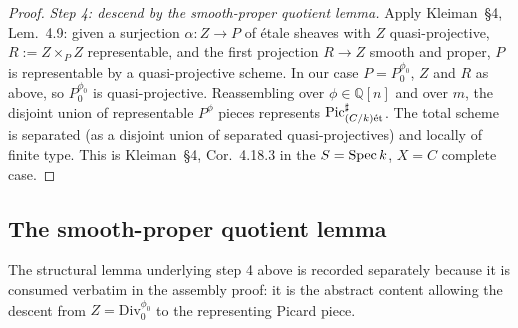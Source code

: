 \begin{proof}
  \emph{Step 4: descend by the smooth-proper quotient lemma.}
  Apply Kleiman~\S 4, Lem.~4.9: given a surjection \(\alpha : Z \to P\)
  of \'etale sheaves with \(Z\) quasi-projective, \(R := Z \times_P Z\)
  representable, and the first projection \(R \to Z\) smooth and proper,
  \(P\) is representable by a quasi-projective scheme. In our case
  \(P = P^{\phi_0}_0\), \(Z\) and \(R\) as above, so \(P^{\phi_0}_0\) is
  quasi-projective. Reassembling over \(\phi \in \mathbb{Q}[n]\) and
  over \(m\), the disjoint union of representable \(P^\phi\) pieces represents
  \(\operatorname{Pic}^\sharp_{(C/k)\mathrm{\acute{e}t}}\). The total scheme is separated (as a disjoint
  union of separated quasi-projectives) and locally of finite type. This
  is Kleiman~\S 4, Cor.~4.18.3 in the \(S = \operatorname{Spec} k\),
  \(X = C\) complete case.
\end{proof}

\subsection{The smooth-proper quotient lemma}
\label{subsec:fga_pic_qt}

The structural lemma underlying step 4 above is recorded separately
because it is consumed verbatim in the assembly proof: it is the
abstract content allowing the descent from \(Z = \mathrm{Div}^{\phi_0}_0\) to the
representing Picard piece.


